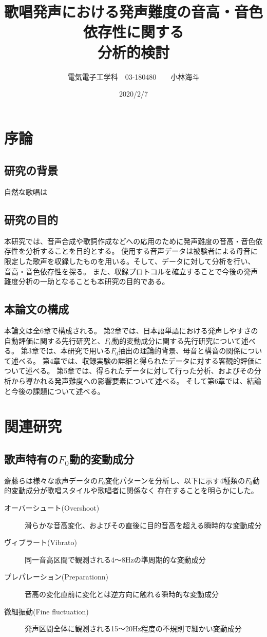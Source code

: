 \documentclass[10.5ptj,a4j,dvipdfmx,uplatex, oneside, openany, report, draft]{jsbook}%
\title{歌唱発声における発声難度の音高・音色依存性に関する\\分析的検討}
\author{電気電子工学科　03-180480　　小林海斗}
\date{2020/2/7}
\begin{document}
\maketitle

\tableofcontents

\chapter{序論}

\section{研究の背景}
自然な歌唱は


\section{研究の目的}
本研究では、音声合成や歌詞作成などへの応用のために発声難度の音高・音色依存性を分析することを目的とする。
使用する音声データは被験者による母音に限定した歌声を収録したものを用いる。そして、データに対して分析を行い、
音高・音色依存性を探る。
また、収録プロトコルを確立することで今後の発声難度分析の一助となることも本研究の目的である。

\section{本論文の構成}
本論文は全6章で構成される。
第2章では、日本語単語における発声しやすさの自動評価に関する先行研究と、$F_0$動的変動成分に関する先行研究について述べる。
第3章では、本研究で用いる$F_0$抽出の理論的背景、母音と構音の関係について述べる。
第4章では、収録実験の詳細と得られたデータに対する客観的評価について述べる。
第5章では、得られたデータに対して行った分析、およびその分析から導かれる発声難度への影響要素について述べる。
そして第6章では、結論と今後の課題について述べる。



\chapter{関連研究}

\section{歌声特有の$F_0$動的変動成分}
齋藤らは様々な歌声データの$F_0$変化パターンを分析し、以下に示す4種類の$F_0$動的変動成分が歌唱スタイルや歌唱者に関係なく
存在することを明らかにした\cite{singbyspeaking}。
\begin{description}
    \item[オーバーシュート(Overshoot)]滑らかな音高変化、およびその直後に目的音高を超える瞬時的な変動成分
    \item[ヴィブラート(Vibrato)]同一音高区間で観測される4〜8Hzの準周期的な変動成分
    \item[プレパレーション(Preparationn)]音高の変化直前に変化とは逆方向に触れる瞬時的な変動成分
    \item[微細振動(Fine fluctuation)] 発声区間全体に観測される15〜20Hz程度の不規則で細かい変動成分
\end{description}
\end{document}
